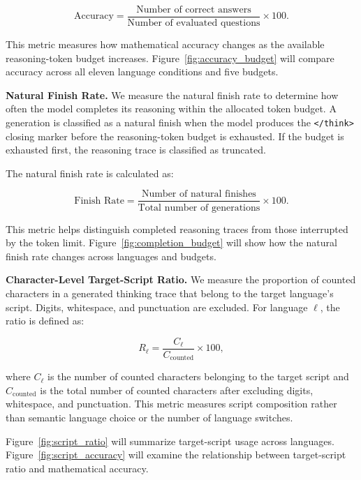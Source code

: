\documentclass[11pt]{article}
\begin{document}
\begin{equation}
\text{Accuracy} =
\frac{\text{Number of correct answers}}
{\text{Number of evaluated questions}}
\times 100.
\end{equation}

This metric measures how mathematical accuracy changes as the available reasoning-token budget increases. Figure~\ref{fig:accuracy_budget} will compare accuracy across all eleven language conditions and five budgets.

\textbf{Natural Finish Rate.}
We measure the natural finish rate to determine how often the model completes its reasoning within the allocated token budget. A generation is classified as a natural finish when the model produces the \texttt{</think>} closing marker before the reasoning-token budget is exhausted. If the budget is exhausted first, the reasoning trace is classified as truncated.

The natural finish rate is calculated as:

\begin{equation}
\text{Finish Rate} =
\frac{\text{Number of natural finishes}}
{\text{Total number of generations}}
\times 100.
\end{equation}

This metric helps distinguish completed reasoning traces from those interrupted by the token limit. Figure~\ref{fig:completion_budget} will show how the natural finish rate changes across languages and budgets.

\textbf{Character-Level Target-Script Ratio.}
We measure the proportion of counted characters in a generated thinking trace that belong to the target language's script. Digits, whitespace, and punctuation are excluded. For language $\ell$, the ratio is defined as:

\begin{equation}
R_{\ell} =
\frac{C_{\ell}}{C_{\mathrm{counted}}}
\times 100,
\end{equation}

where $C_{\ell}$ is the number of counted characters belonging to the target script and $C_{\mathrm{counted}}$ is the total number of counted characters after excluding digits, whitespace, and punctuation. This metric measures script composition rather than semantic language choice or the number of language switches.

Figure~\ref{fig:script_ratio} will summarize target-script usage across languages. Figure~\ref{fig:script_accuracy} will examine the relationship between target-script ratio and mathematical accuracy.
\end{document}
